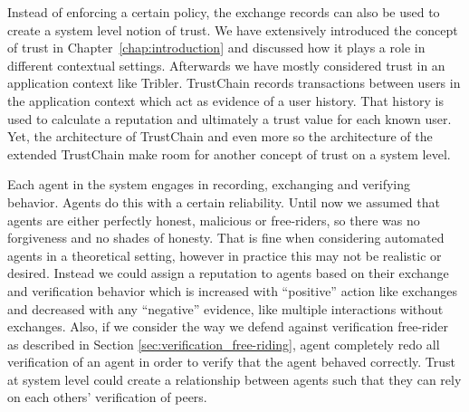 Instead of enforcing a certain policy, the exchange records can also be used to create a system level 
notion of trust. We have extensively introduced the concept of trust in Chapter~\ref{chap:introduction} and discussed
how it plays a role in different contextual settings. Afterwards we have mostly considered trust in 
an application context like Tribler. TrustChain records transactions between users in the application
context which act as evidence of a user history. That history is used to calculate a reputation and
ultimately a trust value for each known user. Yet, the architecture of TrustChain and even more so 
the architecture of the extended TrustChain make room for another concept of trust on a system level.

Each agent in the system engages in recording, exchanging and verifying behavior. Agents do this 
with a certain reliability. Until now we assumed that agents are either perfectly honest, malicious
or free-riders, so there was no forgiveness and no shades of honesty. That is fine when considering
automated agents in a theoretical setting, however in practice this may not be realistic or 
desired. Instead we could assign a reputation to agents based on their exchange and verification 
behavior which is increased with ``positive'' action like exchanges and decreased with any 
``negative'' evidence, like multiple interactions without exchanges. Also, if we consider the way 
we defend against verification free-rider as described in Section \ref{sec:verification_free-riding}, 
agent completely redo all verification of an agent in order to verify that the agent behaved correctly.
Trust at system level could create a relationship between agents such that they can rely on each 
others' verification of peers. 




